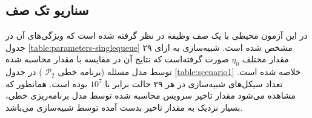 \subsection{سناریو تک صف}
در این آزمون محیطی با یک صف وظیفه در نظر گرفته شده است که ویژگی‌های آن در جدول \ref{table:parameters-singlequeue} مشخص شده است. شبیه‌سازی به ازای ۲۹ مقدار مختلف $\eta_0$ صورت گرفته‌است که نتایج آن در مقایسه با مقدار محاسبه شده توسط مدل مسئله (برنامه خطی
$\mathcal{P}_2$
) در جدول \ref{table:scenario1} خلاصه شده است. تعداد سیکل‌های شبیه‌سازی در هر ۲۹ حالت برابر با $10^7$ بوده است. همانطور که مشاهده می‌شود مقدار تاخیر سرویس محاسبه شده توسط مدل برنامه‌ریزی خطی، بسیار نزدیک به مقدار تاخیر بدست آمده توسط شبیه‌سازی می‌باشد.
\begin{table}
	\centering
	\begin{latin}
		

\end{latin}
\end{table}
